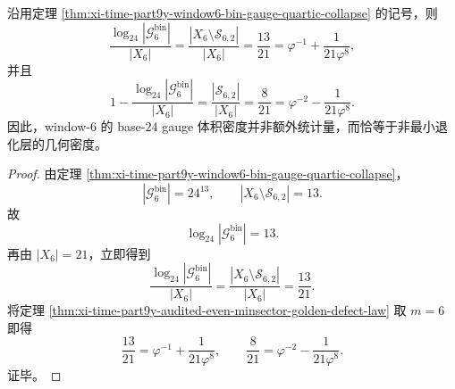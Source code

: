 \begin{corollary}\label{cor:xi-time-part9y-window6-base24-volume-density-identity}
沿用定理 \ref{thm:xi-time-part9y-window6-bin-gauge-quartic-collapse} 的记号，则
\[
\frac{\log_{24}|\mathcal G^{\mathrm{bin}}_6|}{|X_6|}
=
\frac{|X_6\setminus \mathcal S_{6,2}|}{|X_6|}
=
\frac{13}{21}
=
\varphi^{-1}+\frac{1}{21\varphi^8},
\]
并且
\[
1-\frac{\log_{24}|\mathcal G^{\mathrm{bin}}_6|}{|X_6|}
=
\frac{|\mathcal S_{6,2}|}{|X_6|}
=
\frac{8}{21}
=
\varphi^{-2}-\frac{1}{21\varphi^8}.
\]
因此，window-\(6\) 的 base-\(24\) gauge 体积密度并非额外统计量，而恰等于非最小退化层的几何密度。
\end{corollary}
\begin{proof}
由定理 \ref{thm:xi-time-part9y-window6-bin-gauge-quartic-collapse}，
\[
|\mathcal G^{\mathrm{bin}}_6|=24^{13},
\qquad
|X_6\setminus \mathcal S_{6,2}|=13.
\]
故
\[
\log_{24}|\mathcal G^{\mathrm{bin}}_6|=13.
\]
再由 \(|X_6|=21\)，立即得到
\[
\frac{\log_{24}|\mathcal G^{\mathrm{bin}}_6|}{|X_6|}
=
\frac{|X_6\setminus \mathcal S_{6,2}|}{|X_6|}
=
\frac{13}{21}.
\]
将定理 \ref{thm:xi-time-part9y-audited-even-minsector-golden-defect-law} 取 \(m=6\) 即得
\[
\frac{13}{21}
=
\varphi^{-1}+\frac{1}{21\varphi^8},
\qquad
\frac{8}{21}
=
\varphi^{-2}-\frac{1}{21\varphi^8}.
\]
证毕。
\end{proof}

